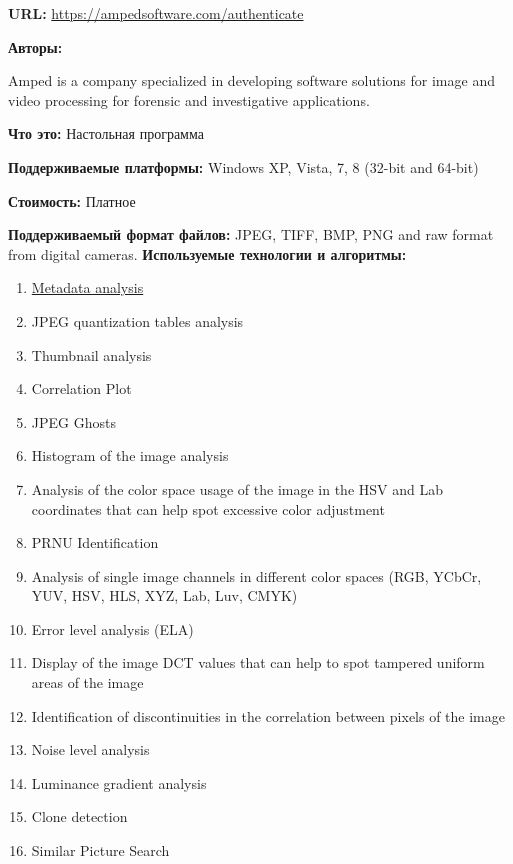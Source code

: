\textbf{URL: } \url{https://ampedsoftware.com/authenticate}

\textbf{Авторы:}

Amped is a company specialized in developing software solutions for image and video processing for forensic and investigative applications.

\textbf{Что это:} Настольная программа

\textbf{Поддерживаемые платформы:} Windows XP, Vista, 7, 8 (32-bit and 64-bit) 

\textbf{Стоимость:} Платное

\textbf{Поддерживаемый формат файлов:} JPEG, TIFF, BMP, PNG and raw format from digital cameras.
\textbf{Используемые технологии и алгоритмы:}

\begin{enumerate}
  \item \href{http://fotoforensics.com/tutorial-meta.php}{Metadata analysis}
  \item JPEG quantization  tables analysis
    
  \item Thumbnail analysis
  
  \item Correlation Plot
  
  \item JPEG Ghosts
  
  \item Histogram of the image analysis
  
  \item Analysis of the color space usage of the image in the HSV and Lab coordinates that can help spot excessive color adjustment
  
  \item PRNU Identification
  
  \item Analysis of single image channels in different color spaces (RGB, YCbCr, YUV, HSV, HLS, XYZ, Lab, Luv, CMYK)
  
  \item Error level analysis (ELA)
    
  \item Display of the image DCT values that can help to spot tampered uniform areas of the image
  
  \item Identification of discontinuities in the correlation between pixels of the image
  
  \item Noise level analysis
  
  \item Luminance gradient analysis

  \item Clone detection
  
  \item Similar Picture Search
  
\end{enumerate} 

